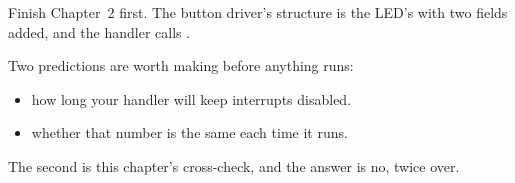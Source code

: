Finish Chapter~2 first. The button driver's structure is the LED's with two fields added, and the
handler calls .

Two predictions are worth making before anything runs:
\begin{itemize}
  \item how long your handler will keep interrupts disabled.
  \item whether that number is the same each time it runs.
\end{itemize}
The second is this chapter's cross-check, and the answer is no, twice over.






